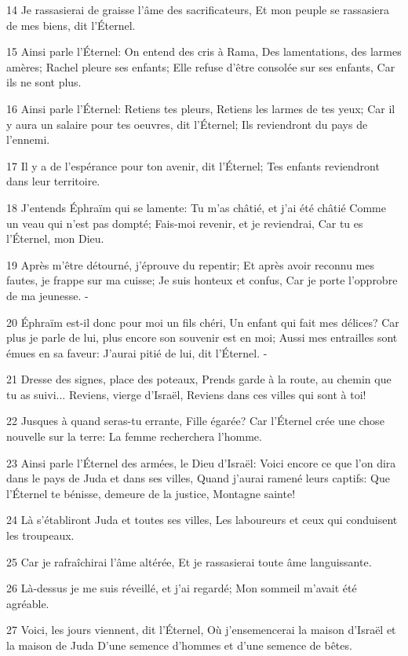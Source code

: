 \par 14 Je rassasierai de graisse l'âme des sacrificateurs, Et mon peuple se rassasiera de mes biens, dit l'Éternel.
\par 15 Ainsi parle l'Éternel: On entend des cris à Rama, Des lamentations, des larmes amères; Rachel pleure ses enfants; Elle refuse d'être consolée sur ses enfants, Car ils ne sont plus.
\par 16 Ainsi parle l'Éternel: Retiens tes pleurs, Retiens les larmes de tes yeux; Car il y aura un salaire pour tes oeuvres, dit l'Éternel; Ils reviendront du pays de l'ennemi.
\par 17 Il y a de l'espérance pour ton avenir, dit l'Éternel; Tes enfants reviendront dans leur territoire.
\par 18 J'entends Éphraïm qui se lamente: Tu m'as châtié, et j'ai été châtié Comme un veau qui n'est pas dompté; Fais-moi revenir, et je reviendrai, Car tu es l'Éternel, mon Dieu.
\par 19 Après m'être détourné, j'éprouve du repentir; Et après avoir reconnu mes fautes, je frappe sur ma cuisse; Je suis honteux et confus, Car je porte l'opprobre de ma jeunesse. -
\par 20 Éphraïm est-il donc pour moi un fils chéri, Un enfant qui fait mes délices? Car plus je parle de lui, plus encore son souvenir est en moi; Aussi mes entrailles sont émues en sa faveur: J'aurai pitié de lui, dit l'Éternel. -
\par 21 Dresse des signes, place des poteaux, Prends garde à la route, au chemin que tu as suivi... Reviens, vierge d'Israël, Reviens dans ces villes qui sont à toi!
\par 22 Jusques à quand seras-tu errante, Fille égarée? Car l'Éternel crée une chose nouvelle sur la terre: La femme recherchera l'homme.
\par 23 Ainsi parle l'Éternel des armées, le Dieu d'Israël: Voici encore ce que l'on dira dans le pays de Juda et dans ses villes, Quand j'aurai ramené leurs captifs: Que l'Éternel te bénisse, demeure de la justice, Montagne sainte!
\par 24 Là s'établiront Juda et toutes ses villes, Les laboureurs et ceux qui conduisent les troupeaux.
\par 25 Car je rafraîchirai l'âme altérée, Et je rassasierai toute âme languissante.
\par 26 Là-dessus je me suis réveillé, et j'ai regardé; Mon sommeil m'avait été agréable.
\par 27 Voici, les jours viennent, dit l'Éternel, Où j'ensemencerai la maison d'Israël et la maison de Juda D'une semence d'hommes et d'une semence de bêtes.
